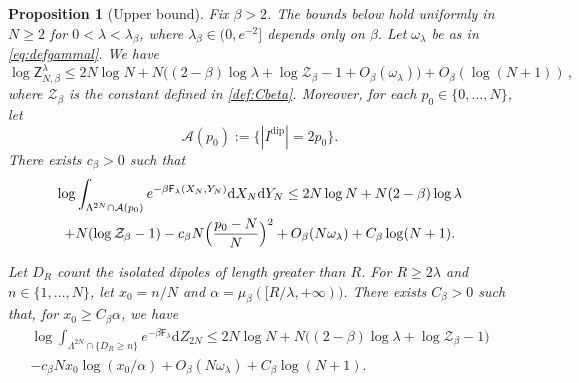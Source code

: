 \documentclass[a4paper,10pt,leqno]{amsart}
\numberwithin{equation}{section}
\newtheorem{prop}{Proposition}[section]
\newcommand{\dd}{\mathrm{d}}
\def\mc{\mathcal}
\def\Z{\mathsf{Z}_{N,\beta}^{\lambda}}
\def\F{\mathsf{F}}
\newcommand{\dip}{\mathrm{dip}}
\begin{document}
\begin{prop}[Upper bound]\label{prop:upper bound}
  Fix $\beta>2$. The bounds below hold uniformly in $N\ge2$ for $0<\lambda<\lambda_\beta$, where $\lambda_\beta\in(0,e^{-2}]$ depends only on $\beta$.
  Let $\omega_\lambda$ be as in \eqref{eq:defgammal}.
  We have
  \begin{equation}\label{ubz}
    \log \Z\leq 2N\log N+N\Big((2-\beta)\log \lambda+\log \mc{Z}_{\beta}-1
    +O_\beta(\omega_\lambda)\Big)+O_\beta(\log(N+1))\,,
  \end{equation}where $\mc{Z}_\beta$ is the constant defined in \eqref{def:Cbeta}. Moreover, for each $p_0\in\{0,\ldots,N\}$, let
  \begin{equation*}
    \mc A(p_0):=\{|I^\dip|=2p_0\}.
  \end{equation*}
  There exists $c_\beta>0$ such that
  \begin{multline}\label{eq:neutral bound}
    \log\int_{\Lambda^{2N}\cap\mc A(p_0)}e^{-\beta \F_\lambda(X_N,Y_N)}\dd X_N \dd Y_N \leq 2N\log N +N(2-\beta)\log \lambda\\
    +N(\log \mc{Z}_\beta-1)-c_\beta N \Bigl(\frac{p_0-N}{N}\Bigr)^2+O_\beta(N\omega_\lambda)+C_\beta\log(N+1).
  \end{multline}

  Let $D_R$ count the isolated dipoles of length greater than $R$. For $R\ge2\lambda$ and $n\in\{1,\ldots,N\}$, let $x_0=n/N$ and $\alpha=\mu_\beta([R/\lambda,+\infty))$. There exists $C_\beta>0$ such that, for $x_0\ge C_\beta\alpha$, we have
  \begin{multline}\label{eq:u bound}
    \log\int_{\Lambda^{2N}\cap\{D_R\ge n\}}e^{-\beta\F_\lambda}\dd Z_{2N}
    \le2N\log N+N\bigl((2-\beta)\log\lambda+\log\mc Z_\beta-1\bigr)\\
    -c_\beta Nx_0\log(x_0/\alpha)+O_\beta(N\omega_\lambda)+C_\beta\log(N+1).
  \end{multline}
\end{prop}

\medskip
\end{document}
